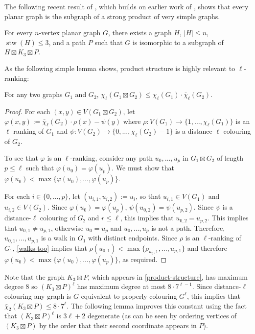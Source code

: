 \documentclass[kpfonts]{patmorin}
\DeclareMathOperator{\stw}{stw}
\newcommand{\lrn}{\chi_{\ell}}
\newcommand{\dtcn}{\bar{\chi}_2}
\newcommand{\dlcn}{\bar{\chi}_\ell}
\theoremstyle{named}
\begin{document}
The following recent result of \citet{dujmovic.joret.ea:planar}, which builds on earlier work of \citet{pilipczuk.siebertz:polynomial}, shows that every planar graph is the subgraph of a strong product of very simple graphs.

\begin{thm}\label{product-structure}
    For every $n$-vertex planar graph $G$, there exists a graph $H$, $|H|\le n$, $\stw(H)\le 3$, and a path $P$ such that $G$ is isomorphic to a subgraph of $H\boxtimes K_3\boxtimes P$.
\end{thm}

As the following simple lemma shows, product structure is highly relevant to $\ell$-ranking:

\begin{lem}\label{product-lemma}
    For any two graphs $G_1$ and $G_2$, $\lrn(G_1\boxtimes G_2)\le \lrn(G_1)\cdot\dlcn(G_2)$.
\end{lem}

\begin{proof}
    For each $(x,y)\in V(G_1\boxtimes G_2)$, let $\varphi(x,y):=\dlcn(G_2)\cdot \rho(x) - \psi(y)$ where $\rho:V(G_1)\to\{1,\ldots,\lrn(G_1)\}$ is an $\ell$-ranking of $G_1$ and $\psi:V(G_2)\to\{0,\ldots,\dlcn(G_2)-1\}$ is a distance-$\ell$ colouring of $G_2$.

    To see that $\varphi$ is an $\ell$-ranking, consider any
    path $u_0,\ldots,u_p$ in $G_1\boxtimes G_2$ of length $p\le\ell$ such that $\varphi(u_0)=\varphi(u_p)$.  We must show that $\varphi(u_0)<\max\{\varphi(u_0),\ldots,\varphi(u_p)\}$.

    For each $i\in\{0,\ldots,p\}$, let $(u_{i,1},u_{i,2}):=u_i$, so that $u_{i,1}\in V(G_1)$ and $u_{i,2}\in V(G_2)$. Since $\varphi(u_0)=\varphi(u_p)$, $\psi(u_{0,2})=\psi(u_{p,2})$. Since $\psi$ is a distance-$\ell$ colouring of $G_2$ and $r\le\ell$, this implies that $u_{0,2}=u_{p,2}$.  This implies that $u_{0,1}\neq u_{p,1}$, otherwise $u_0=u_p$ and $u_0,\ldots,u_p$ is not a path.  Therefore, $u_{0,1},\ldots,u_{p,1}$ is a walk in $G_1$ with distinct endpoints.
    Since $\rho$ is an $\ell$-ranking of $G_1$, \cref{walks-too} implies that $\rho(u_{0,1})<\max\{\rho_{u_0,1},\ldots,u_{p,1}\}$ and therefore $\varphi(u_0)<\max\{\varphi(u_0),\ldots,\varphi(u_p)\}$, as required.
\end{proof}

Note that the graph $K_3\boxtimes P$, which appears in \cref{product-structure}, has maximum degree 8 so $(K_3\boxtimes P)^\ell$ has maximum degree at most $8\cdot 7^{\ell-1}$.  Since distance-$\ell$ colouring any graph is $G$ equivalent to properly colouring $G^{\ell}$, this implies that $\dtcn(K_3\boxtimes P)\le 8\cdot7^\ell$. The following lemma improves this constant using the fact that $(K_3\boxtimes P)^\ell$ is $3\ell+2$ degenerate (as can be seen by ordering vertices of $(K_3\boxtimes P)$ by the order that their second coordinate appears in $P$).
\end{document}
